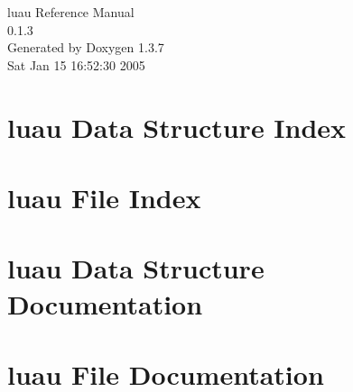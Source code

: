 \documentclass[a4paper]{book}
\begin{document}
\begin{titlepage}
\vspace*{7cm}
\begin{center}
{\Large luau Reference Manual\\[1ex]\large 0.1.3 }\\
\vspace*{1cm}
{\large Generated by Doxygen 1.3.7}\\
\vspace*{0.5cm}
{\small Sat Jan 15 16:52:30 2005}\\
\end{center}
\end{titlepage}
\clearemptydoublepage
{}
\tableofcontents
\clearemptydoublepage
{}
\chapter{luau Data Structure Index}

\chapter{luau File Index}

\chapter{luau Data Structure Documentation}
















\chapter{luau File Documentation}




















\printindex
\end{document}
